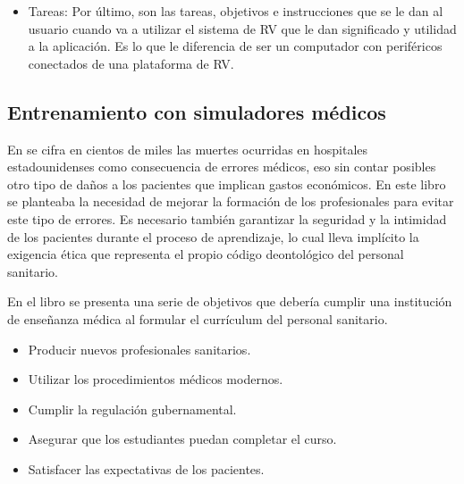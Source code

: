 \begin{itemize}
    \item Tareas: Por último, son las tareas, objetivos e instrucciones que se le dan al usuario cuando va a utilizar el sistema de \ac{RV} que le dan significado y utilidad a la aplicación. Es lo que le diferencia de ser un computador con periféricos conectados de una plataforma de \ac{RV}.
\end{itemize}



\subsection{Entrenamiento con simuladores médicos}
\label{art:entrenamiento}



En \cite{donaldson2000err} se cifra en cientos de miles las muertes ocurridas en hospitales estadounidenses como consecuencia de errores médicos, eso sin contar posibles otro tipo de daños a los pacientes que implican gastos económicos. En este libro se planteaba la necesidad de mejorar la formación de los profesionales para evitar este tipo de errores. 
Es necesario también garantizar la seguridad y la intimidad de los pacientes durante el proceso de aprendizaje, lo cual lleva implícito la exigencia ética que representa el propio código deontológico del personal sanitario. 

En el libro \cite{dent2017practical} se presenta una serie de objetivos que debería cumplir una institución de enseñanza médica al formular el currículum del personal sanitario.
\begin{itemize}
    \item Producir nuevos profesionales sanitarios.
    \item Utilizar los procedimientos médicos modernos.
    \item Cumplir la regulación gubernamental.
    \item Asegurar que los estudiantes puedan completar el curso.
    \item Satisfacer las expectativas de los pacientes.
\end{itemize}


